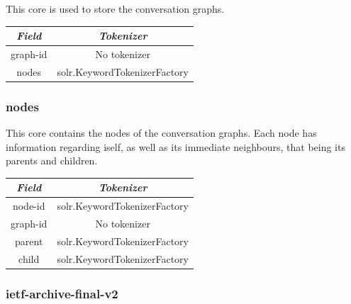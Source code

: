 \documentclass[a4paper,english]{report}
\begin{document}
This core is used to store the conversation graphs.

\begin{center}
 \begin{tabular}{||c c||} 
 \hline
 \textit{Field} & \textit{Tokenizer} \\ [1ex] 
 \hline\hline

graph-id & No tokenizer\\

\hline

nodes & solr.KeywordTokenizerFactory\\

\hline

\end{tabular}
\end{center}


\subsubsection{nodes}


This core contains the nodes of the conversation graphs. Each node has information regarding iself, as well as its immediate neighbours, that being its parents and children. 


\begin{center}
 \begin{tabular}{||c c||} 
 \hline
 \textit{Field} & \textit{Tokenizer} \\ [1ex] 
 \hline\hline


node-id & solr.KeywordTokenizerFactory\\

\hline

graph-id & No tokenizer\\

\hline

parent & solr.KeywordTokenizerFactory\\

\hline

child & solr.KeywordTokenizerFactory\\

\hline



\end{tabular}
\end{center}




\subsubsection{ietf-archive-final-v2}
\end{document}
